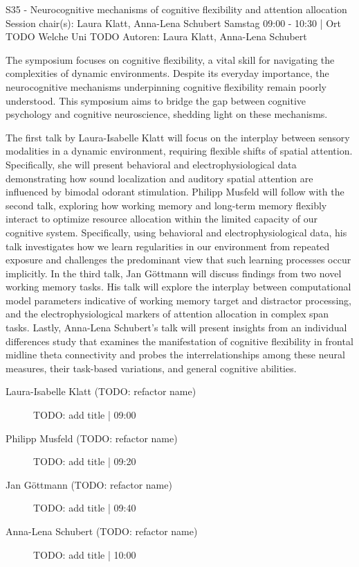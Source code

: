 
            \begin{symposium}
            {S35 - Neurocognitive mechanisms of cognitive flexibility and attention allocation }
            {Session chair(s): Laura Klatt, Anna-Lena Schubert}
            {Samstag 09:00 - 10:30 | Ort TODO}
            {Welche Uni TODO}
            Autoren: Laura Klatt, Anna-Lena Schubert

The symposium focuses on cognitive flexibility, a vital skill for navigating the complexities of dynamic environments. Despite its everyday importance, the neurocognitive mechanisms underpinning cognitive flexibility remain poorly understood. This symposium aims to bridge the gap between cognitive psychology and cognitive neuroscience, shedding light on these mechanisms.

The first talk by Laura-Isabelle Klatt will focus on the interplay between sensory modalities in a dynamic environment, requiring flexible shifts of spatial attention. Specifically, she will present behavioral and electrophysiological data demonstrating how sound localization and auditory spatial attention are influenced by bimodal odorant stimulation. Philipp Musfeld will follow with the second talk, exploring how working memory and long-term memory flexibly interact to optimize resource allocation within the limited capacity of our cognitive system. Specifically, using behavioral and electrophysiological data, his talk investigates how we learn regularities in our environment from repeated exposure and challenges the predominant view that such learning processes occur implicitly. In the third talk, Jan Göttmann will discuss findings from two novel working memory tasks. His talk will explore the interplay between computational model parameters indicative of working memory target and distractor processing, and the electrophysiological markers of attention allocation in complex span tasks. Lastly, Anna-Lena Schubert's talk will present insights from an individual differences study that examines the manifestation of cognitive flexibility in frontal midline theta connectivity and probes the interrelationships among these neural measures, their task-based variations, and general cognitive abilities.
            \begin{description}    
            
                \item [Laura-Isabelle Klatt  (TODO: refactor name)] TODO: add title \textcolor{mygray}{ | 09:00}    
                
                \item [Philipp Musfeld (TODO: refactor name)] TODO: add title \textcolor{mygray}{ | 09:20}    
                
                \item [Jan Göttmann (TODO: refactor name)] TODO: add title \textcolor{mygray}{ | 09:40}    
                
                \item [Anna-Lena Schubert (TODO: refactor name)] TODO: add title \textcolor{mygray}{ | 10:00}    
                
            \end{description} 
            \end{symposium}
            